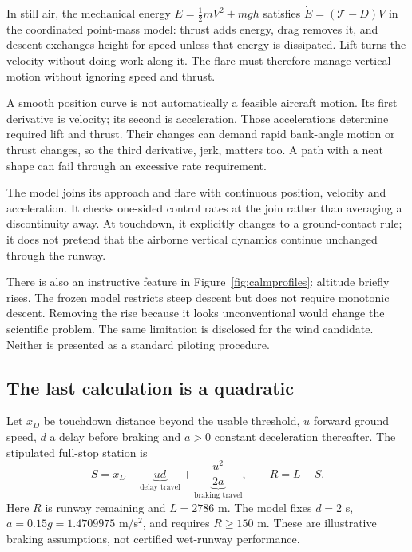 In still air, the mechanical energy $E=\tfrac12mV^2+mgh$ satisfies $\dot E=(\mathcal T-D)V$ in the coordinated point-mass model: thrust adds energy, drag removes it, and descent exchanges height for speed unless that energy is dissipated. Lift turns the velocity without doing work along it. The flare must therefore manage vertical motion without ignoring speed and thrust.

A smooth position curve is not automatically a feasible aircraft motion. Its first derivative is velocity; its second is acceleration. Those accelerations determine required lift and thrust. Their changes can demand rapid bank-angle motion or thrust changes, so the third derivative, jerk, matters too. A path with a neat shape can fail through an excessive rate requirement.

The model joins its approach and flare with continuous position, velocity and acceleration. It checks one-sided control rates at the join rather than averaging a discontinuity away. At touchdown, it explicitly changes to a ground-contact rule; it does not pretend that the airborne vertical dynamics continue unchanged through the runway.

There is also an instructive feature in Figure~\ref{fig:calmprofiles}: altitude briefly rises. The frozen model restricts steep descent but does not require monotonic descent. Removing the rise because it looks unconventional would change the scientific problem. The same limitation is disclosed for the wind candidate. Neither is presented as a standard piloting procedure.
\clearpage
\subsection*{The last calculation is a quadratic}
Let $x_D$ be touchdown distance beyond the usable threshold, $u$ forward ground speed, $d$ a delay before braking and $a>0$ constant deceleration thereafter. The stipulated full-stop station is
\begin{equation}
S=x_D+\underbrace{ud}_{\text{delay travel}}+\underbrace{\frac{u^2}{2a}}_{\text{braking travel}},\qquad R=L-S.
\label{eq:stop}
\end{equation}
Here $R$ is runway remaining and $L=2786$ m. The model fixes $d=2$ s, $a=0.15g=1.4709975$ m/s$^2$, and requires $R\geq150$ m. These are illustrative braking assumptions, not certified wet-runway performance.


